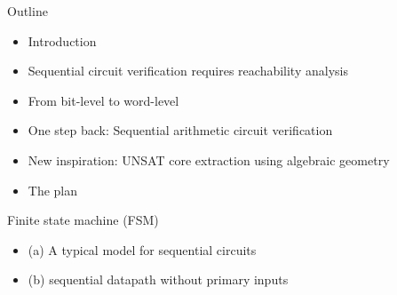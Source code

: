 \documentclass[xcolor=dvipsnames]{beamer}
\newcommand{\bi}{\begin{itemize}}
\newcommand{\ei}{\end{itemize}}
\begin{document}
\begin{frame}{\large{Outline}}
\bi
\item Introduction
\item \alert{Sequential circuit verification requires reachability analysis}
\item From bit-level to word-level
\item One step back: Sequential arithmetic circuit verification
\item New inspiration: UNSAT core extraction using algebraic geometry
\item The plan
\ei
\end{frame}
\begin{frame}{\large{Finite state machine (FSM)}}
\begin{figure}[hbt]
\end{figure}
\bi
\item (a) A typical model for sequential circuits
\item (b) sequential datapath without primary inputs
\ei
\end{frame}
\end{document}
